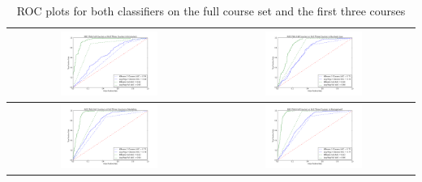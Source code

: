 \documentclass{sigchi}
\begin{document}
\begin{table}[h!]
 \begin{center}
   \begin{tabular}{| c | c |}
   \hline
   \includegraphics[width=0.5\textwidth]{figures/ROC-Economics}
   &
   \includegraphics[width=0.5\textwidth]{figures/ROC-Business-Law}
   \\
   \hline
   \includegraphics[width=0.5\textwidth]{figures/ROC-Marketing}
	&   
   \includegraphics[width=0.5\textwidth]{figures/ROC-Management}
   \\
   \hline
   \end{tabular}
 \end{center}
 \caption{ROC plots for both classifiers on the full course set and the first three courses }~\label{tab:rocTable}
\end{table}
\end{document}
